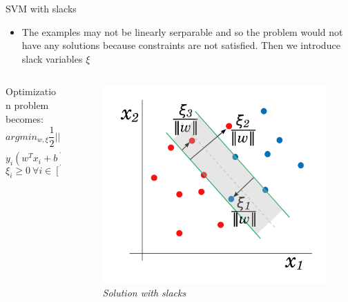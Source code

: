 \begin{frame}{SVM with slacks}
	\begin{itemize}\setlength\itemsep{1em}
		\item The examples may not be linearly serparable and so the problem would not have any solutions because constraints are not satisfied. Then we introduce slack variables $\xi$
	\end{itemize}
	\begin{columns}
		\begin{column}{0.5\textwidth}\centering
			Optimization problem becomes:
			$$arg min_{w, \xi} \frac{1}{2} ||w||^2 + C \sum_{i = 1}^{n}\xi_i$$
			$$y_i (w^T x_i + b) \geq 1 - \xi_i \ \forall i \in [1, n]$$
			$$\xi_i \geq 0 \ \forall i \in [1, n]$$
		\end{column}
		\begin{column}{0.5\textwidth}\centering
			\begin{figure}[htbp]
				\centering
				\includegraphics[scale = 0.15]{./images/slack2.png}
				\caption{\textit{Solution with slacks}}
			\end{figure}
		\end{column}
	\end{columns}
	
\end{frame}
